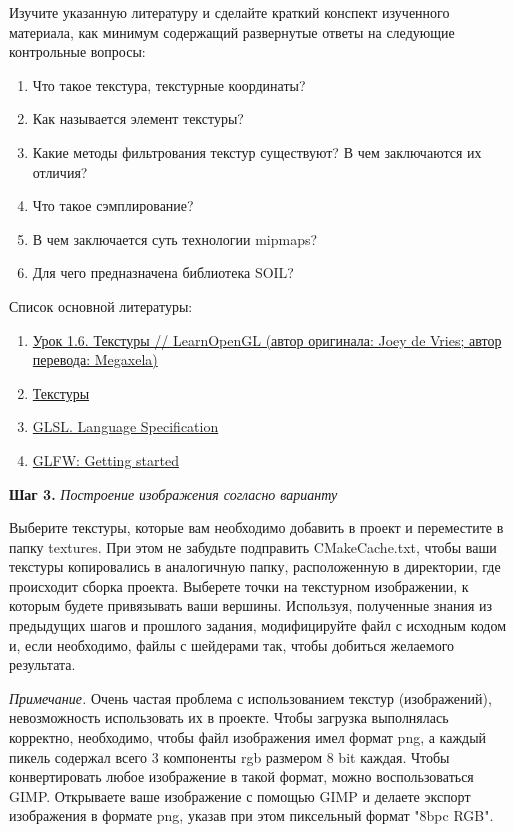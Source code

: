 \documentclass[a4paper,12pt]{article}
\begin{document}
    Изучите указанную литературу и сделайте краткий конспект изученного материала, как минимум содержащий развернутые ответы на следующие контрольные вопросы:

    \begin{enumerate}
        \item 
        Что такое текстура, текстурные координаты?
        \item 
        Как называется элемент текстуры?
        \item 
        Какие методы фильтрования текстур существуют? В чем заключаются их отличия?
        \item 
        Что такое сэмплирование?
        \item 
        В чем заключается суть технологии mipmaps?
        \item 
        Для чего предназначена библиотека SOIL?
    \end{enumerate}

    Список основной литературы:
    \begin{enumerate}
        \item \href{https://habr.com/ru/post/315294/}{Урок 1.6. Текстуры // LearnOpenGL (автор оригинала: Joey de Vries; автор перевода: Megaxela)}
        \item \href{Ravesli.com https://ravesli.com/urok-6-tekstury-v-opengl/}{Текстуры}
        \item \href{https://www.khronos.org/registry/OpenGL/specs/gl/}{GLSL. Language Specification}
        \item \href{https://www.glfw.org/docs/latest/quick.html}{GLFW: Getting started}
    \end{enumerate}
    
    \textbf{Шаг 3.} \textit{Построение изображения согласно варианту}
    
    Выберите текстуры, которые вам необходимо добавить в проект и переместите в папку \textquotedbl textures\textquotedbl. При этом не забудьте подправить \textquotedbl CMakeCache.txt\textquotedbl, чтобы ваши текстуры копировались в аналогичную папку, расположенную в директории, где происходит сборка проекта. Выберете точки на текстурном изображении, к которым будете привязывать ваши вершины. Используя, полученные знания из предыдущих шагов и прошлого задания, модифицируйте файл с исходным кодом и, если необходимо, файлы с шейдерами так, чтобы добиться желаемого результата.

    \textit{Примечание.} Очень частая проблема с использованием текстур (изображений), невозможность использовать их в проекте. Чтобы загрузка выполнялась корректно, необходимо, чтобы файл изображения имел формат png, а каждый пикель содержал всего 3 компоненты rgb размером 8 bit каждая. Чтобы конвертировать любое изображение в такой формат, можно воспользоваться GIMP. Открываете ваше изображение с помощью GIMP и делаете экспорт изображения в формате png, указав при этом пиксельный формат "8bpc RGB".
    
\end{document}
